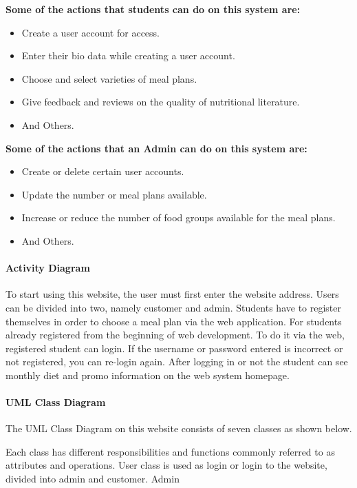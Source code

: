 \documentclass{article}
\begin{document}
\textbf{Some of the actions that students can do on this system are:}
\begin{itemize}
\item Create a user account for access.
\item Enter their bio data while creating a user account.
\item Choose and select varieties of meal plans.
\item Give feedback and reviews on the quality of nutritional literature.
\item And Others.
\end{itemize}

\textbf{Some of the actions that an Admin can do on this system are:}
\begin{itemize}
\item Create or delete certain user accounts.
\item Update the number or meal plans available.
\item Increase or reduce the number of food groups available for the meal plans.
\item And Others.
\end{itemize}

\paragraph{Activity Diagram \\}
To start using this website, the user must first enter the website address. Users can be divided into two, namely customer and admin.  Students have to register themselves in order to choose a meal plan via the web application. For students already registered from the beginning of web development. To do it via the web, registered student can login. If the username or password entered is incorrect or not registered, you can re-login again. After logging in or not the student can see monthly diet and promo information on the web system homepage.

\paragraph{UML Class Diagram \\}
The UML Class Diagram on this website consists of seven classes as shown below.

Each class has different responsibilities and functions commonly referred to as attributes and operations. User class is used as login or login to the website, divided into admin and customer. Admin
\end{document}
